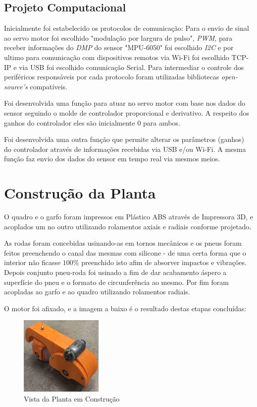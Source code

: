 \documentclass[conference,harvard,brazil,english]{sbatex}
\begin{document}
        \subsection{Projeto Computacional}
        
            Inicialmente foi estabelecido os protocolos de comunicação: Para o envio de sinal ao servo motor foi escolhido "modulação por largura de pulso", \textit{PWM}, para receber informações do \textit{DMP} do sensor "MPU-6050" foi escolhido \textit{I2C} e por ultimo para comunicação com dispositivos remotos via Wi-Fi foi escolhido TCP-IP e via USB foi escolhido comunicação Serial. Para intermediar o controle dos periféricos responsáveis por cada protocolo foram utilizadas bibliotecas \textit{open-source's} compatíveis.
            
            Foi desenvolvida uma função para atuar no servo motor com base nos dados do sensor seguindo o molde de controlador proporcional e derivativo. A respeito dos ganhos do controlador eles são inicialmente $0$ para ambos.
            
            Foi desenvolvida uma outra função que permite alterar os parâmetros (ganhos) do controlador através de informações recebidas via USB e/ou Wi-Fi. A mesma função faz envio dos dados do sensor em tempo real via mesmos meios.
            
    \section{Construção da Planta}
    
        O quadro e o garfo foram impressos em Plástico ABS através de Impressora 3D, e acoplados um no outro utilizando rolamentos axiais e radiais conforme projetado.
        
        As rodas foram concebidas usinando-as em tornos mecânicos e os pneus foram feitos preenchendo o canal das mesmas com silicone - de uma certa forma que o interior não ficasse $100\%$ preenchido isto afim de absorver impactos e vibrações. Depois conjunto pneu-roda foi usinado a fim de dar acabamento áspero a superfície do pneu e o formato de circunferência ao mesmo. Por fim foram acopladas ao garfo e ao quadro utilizando rolamentos radiais.
        
        O motor foi afixado, e a imagem a baixo é o resultado destas etapas concluídas:
        
        \begin{figure}[h]
            \centering
            \includegraphics[width=4cm]{imagens/planta/motinhaTL.jpg}
            \caption{Vista da Planta em Construção}
        \end{figure}
        
\end{document}
